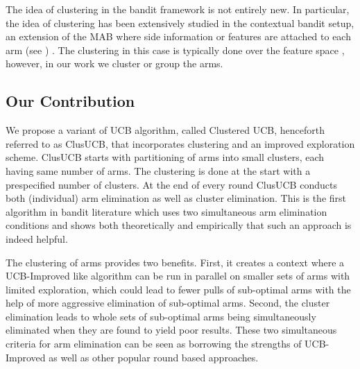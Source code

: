 The idea of clustering in the bandit framework is not entirely new. In particular, the idea of clustering has been extensively studied in the contextual bandit setup, an extension of the MAB where side information or features are attached to each arm (see  \cite{auer2002using,langford2008epoch,li2010contextual,beygelzimer2011contextual,slivkins2014contextual}) . The clustering in this case is typically done over the feature space \cite{bui2012clustered,cesa2013gang,gentile2014online}, however, in our work we cluster or group the arms.  

\vspace*{-0.7em}
\subsection{Our Contribution}
We propose a variant of UCB algorithm, called Clustered UCB, henceforth referred to as ClusUCB, that incorporates clustering and an improved exploration scheme. ClusUCB starts with partitioning of arms into small clusters, each having same number of arms. The clustering is done at the start with a prespecified number of clusters. At the end of every round ClusUCB conducts both (individual) arm elimination as well as cluster elimination. This is the first algorithm in bandit literature which uses two simultaneous arm elimination conditions and shows both theoretically and empirically that such an approach is indeed helpful.



The clustering of arms provides two benefits. First, it creates a context where a UCB-Improved like algorithm can be run in parallel on smaller sets of arms with limited exploration, which could lead to fewer pulls of sub-optimal arms with the help of  more aggressive elimination of sub-optimal arms. Second, the cluster elimination leads to whole sets of sub-optimal arms being simultaneously eliminated when they are found to yield poor results. These two simultaneous criteria for arm elimination can be seen as borrowing the strengths of UCB-Improved as well as other popular round based approaches. 

